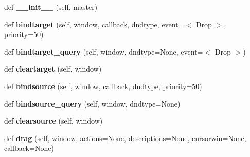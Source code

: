 \begin{DoxyCompactItemize}
\item 
\mbox{\label{class_python_01_g_u_i_1_1lib_1_1_tk_d_n_d__wrapper_1_1_tk_d_n_d_ad342c0a27d97eb94515325d3b6ad6570}} 
def {\bfseries \+\_\+\+\_\+init\+\_\+\+\_\+} (self, master)
\item 
\mbox{\label{class_python_01_g_u_i_1_1lib_1_1_tk_d_n_d__wrapper_1_1_tk_d_n_d_acebc4ac76f613f633b3e476efc88dec2}} 
def {\bfseries bindtarget} (self, window, callback, dndtype, event=\textquotesingle{}$<$ Drop $>$\textquotesingle{}, priority=50)
\item 
\mbox{\label{class_python_01_g_u_i_1_1lib_1_1_tk_d_n_d__wrapper_1_1_tk_d_n_d_ac36db6c798722f49567c636fcac2e694}} 
def {\bfseries bindtarget\+\_\+query} (self, window, dndtype=None, event=\textquotesingle{}$<$ Drop $>$\textquotesingle{})
\item 
\mbox{\label{class_python_01_g_u_i_1_1lib_1_1_tk_d_n_d__wrapper_1_1_tk_d_n_d_a1274e56dc85e730e097808972d1f0db1}} 
def {\bfseries cleartarget} (self, window)
\item 
\mbox{\label{class_python_01_g_u_i_1_1lib_1_1_tk_d_n_d__wrapper_1_1_tk_d_n_d_a6d4ef01c3c3cc65f0d284a0b8ada168b}} 
def {\bfseries bindsource} (self, window, callback, dndtype, priority=50)
\item 
\mbox{\label{class_python_01_g_u_i_1_1lib_1_1_tk_d_n_d__wrapper_1_1_tk_d_n_d_a0ef46aa2eca68f73f6d1931ac86c8be0}} 
def {\bfseries bindsource\+\_\+query} (self, window, dndtype=None)
\item 
\mbox{\label{class_python_01_g_u_i_1_1lib_1_1_tk_d_n_d__wrapper_1_1_tk_d_n_d_aeec016cb1abe1708a868bd613d97a6e0}} 
def {\bfseries clearsource} (self, window)
\item 
\mbox{\label{class_python_01_g_u_i_1_1lib_1_1_tk_d_n_d__wrapper_1_1_tk_d_n_d_af8e2d5c954de8f6dbf6b7b453205f123}} 
def {\bfseries drag} (self, window, actions=None, descriptions=None, cursorwin=None, callback=None)
\end{DoxyCompactItemize}
